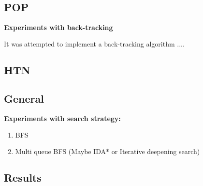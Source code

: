 \documentclass[Main]{subfiles}
\begin{document}
\subsection{POP}

\bf{Experiments with back-tracking}

It was attempted to implement a back-tracking algorithm ....



\subsection{HTN}


\subsection{General} 


\bf{Experiments with search strategy:}

\begin{enumerate}
    \item BFS 
    \item Multi queue BFS (Maybe IDA* or Iterative deepening search)
\end{enumerate}



\subsection{Results}
\end{document}
